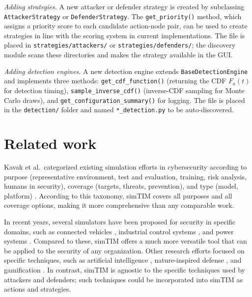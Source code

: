 \documentclass{llncs}
\begin{document}
\emph{Adding strategies.}
A new attacker or defender strategy is created by subclassing \texttt{AttackerStrategy} or \texttt{DefenderStrategy}.%
The \texttt{get\_priority()} method, which assigns a priority score to each candidate action-node pair, can be used to create strategies in line with the scoring system in current implementations. The file is placed in \texttt{strategies/attackers/} or \texttt{strategies/defenders/}; the discovery module scans these directories and makes the strategy available in the GUI.

\emph{Adding detection engines.}
A new detection engine extends \texttt{BaseDetectionEngine} and implements three methods: \texttt{get\_cdf\_function()} (returning the CDF $F_a(t)$ for detection timing), \texttt{sample\_inverse\_cdf()} (inverse-CDF sampling for Monte Carlo draws), and \texttt{get\_configuration\_summary()} for logging. The file is placed in the \texttt{detection/} folder and named \texttt{*\_detection.py} to be auto-discovered.




\section{Related work}

Kavak et al.\ categorized existing simulation efforts in cybersecurity according to purpose (representative environment, test and evaluation, training, risk analysis, humans in security), coverage (targets, threats, prevention), and type (model, platform) \cite{kavak2021simulation}.
According to this taxonomy, simTIM covers all purposes and all coverage options, making it more comprehensive than any comparable work.

In recent years, several simulators have been proposed for security in specific domains, such as connected vehicles \cite{malik2020analysis}, industrial control systems \cite{masi2023securing}, and power systems \cite{qiu2025cyber}.
Compared to these, simTIM offers a much more versatile tool that can be applied to the security of any organization.
Other research efforts focused on specific techniques, such as artificial intelligence \cite{jaber2022towards}, nature-inspired defense \cite{shandilya2022ai}, and gamification \cite{yamin2021serious}.
In contrast, simTIM is agnostic to the specific techniques used by attackers and defenders; such techniques could be incorporated into simTIM as actions and strategies.
\end{document}
